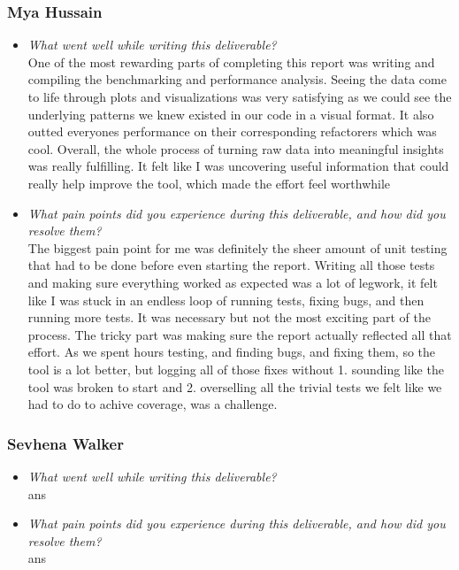 \documentclass[12pt, titlepage]{article}
\begin{document}
\subsubsection*{Mya Hussain}
\begin{itemize}
  \item \textit{What went well while writing this deliverable?} \\ 
  
  One of the most rewarding parts of completing this report was writing and compiling 
  the benchmarking and performance analysis. Seeing the data come to life through plots 
  and visualizations was very satisfying as we could see the underlying patterns we 
  knew existed in our code in a visual format. It also outted everyones performance 
  on their corresponding refactorers which was cool. Overall, the whole process of turning raw data 
  into meaningful insights was really fulfilling.  It felt like I was uncovering useful information that 
  could really help improve the tool, which made the effort feel worthwhile

  \item \textit{What pain points did you experience during this deliverable, and how did you resolve them?}\\ 
  
  The biggest pain point for me was definitely the sheer amount of unit testing that had to 
  be done before even starting the report. Writing all those tests and making sure everything 
  worked as expected was a lot of legwork, it felt like I was stuck in an endless loop of running 
  tests, fixing bugs, and then running more tests. It was necessary but not the most exciting part of 
  the process. The tricky part was making sure the report actually reflected all that effort. As we spent hours 
  testing, and finding bugs, and fixing them, so the tool is a lot better, but logging all of those fixes without 
  1. sounding like the tool was broken to start and 2. overselling all the trivial tests we felt like 
  we had to do to achive coverage, was a challenge.

\end{itemize}

\subsubsection*{Sevhena Walker}
\begin{itemize}
  \item \textit{What went well while writing this deliverable?} \\ 
  
  ans

  \item \textit{What pain points did you experience during this deliverable, and how did you resolve them?}\\ 
  
  ans
\end{itemize}
\end{document}

